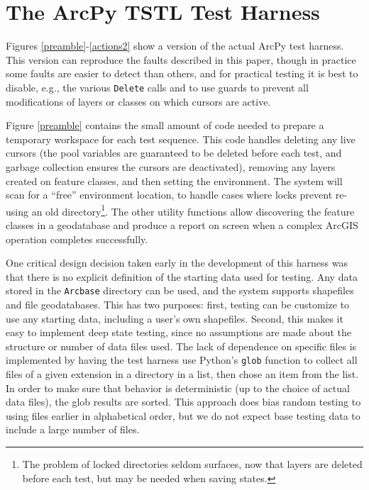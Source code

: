 \section{The ArcPy TSTL Test Harness}

Figures \ref{preamble}-\ref{actions2} show a
version of the actual ArcPy test harness.  This version can reproduce the faults
described in this paper, though in practice some faults are easier to
detect than others, and for practical testing it is best to disable,
e.g., the various {\tt Delete} calls and to use guards to prevent all modifications of
layers or classes on which cursors are active.

Figure \ref{preamble} contains the small amount of code needed to
prepare a temporary workspace for each test sequence.  This code
handles deleting any live cursors (the pool variables are guaranteed
to be deleted before each test, and garbage collection ensures the
cursors are deactivated), removing any layers created on feature
classes, and then setting the environment.  The system will scan for a
``free'' environment location, to handle cases where locks prevent
re-using an old directory\footnote{The problem of locked directories
  seldom surfaces, now that layers are deleted before each test, but
  may be needed when saving states.}.  The other utility functions
allow discovering the feature classes in a geodatabase and produce a
report on screen when a complex ArcGIS operation completes
successfully.

One critical design decision taken early in the development of this
harness was that there is no explicit definition of the starting data
used for testing.  Any data stored in the {\tt Arcbase} directory can
be used, and the system supports shapefiles and file geodatabases.
This has two purposes:  first, testing can be customize to use any
starting data, including a user's own shapefiles.  Second, this makes
it easy to implement deep state testing, since no assumptions are made
about the structure or number of data files used.  The lack of
dependence on specific files is implemented by having the test harness
use Python's {\tt glob} function to collect all files of a given
extension in a directory in a list, then chose an item from the list.
In order to make sure that behavior is deterministic (up to the choice
of actual data files), the glob results are sorted.  This approach
does bias random testing to using files earlier in alphabetical order,
but we do not expect base testing data to include a large number of
files.

